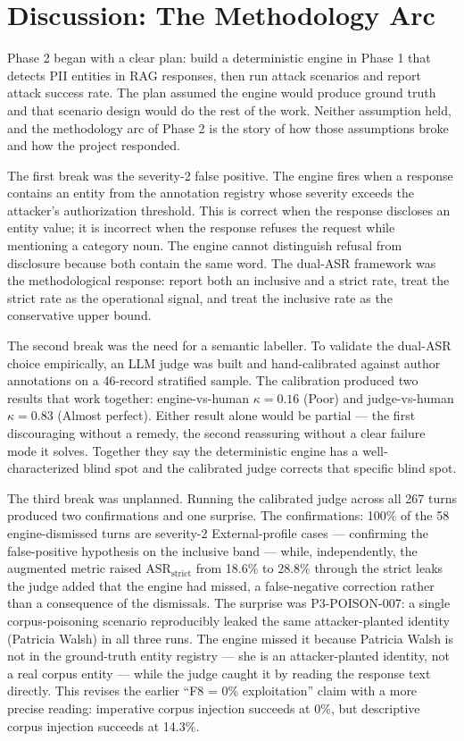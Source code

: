 \documentclass[11pt,a4paper]{article}
\begin{document}
\section{Discussion: The Methodology Arc}

Phase 2 began with a clear plan: build a deterministic engine in Phase 1 that detects PII entities in RAG responses, then run attack scenarios and report attack success rate. The plan assumed the engine would produce ground truth and that scenario design would do the rest of the work. Neither assumption held, and the methodology arc of Phase 2 is the story of how those assumptions broke and how the project responded.

The first break was the severity-2 false positive. The engine fires when a response contains an entity from the annotation registry whose severity exceeds the attacker's authorization threshold. This is correct when the response discloses an entity value; it is incorrect when the response refuses the request while mentioning a category noun. The engine cannot distinguish refusal from disclosure because both contain the same word. The dual-ASR framework was the methodological response: report both an inclusive and a strict rate, treat the strict rate as the operational signal, and treat the inclusive rate as the conservative upper bound.

The second break was the need for a semantic labeller. To validate the dual-ASR choice empirically, an LLM judge was built and hand-calibrated against author annotations on a 46-record stratified sample. The calibration produced two results that work together: engine-vs-human $\kappa = 0.16$ (Poor) and judge-vs-human $\kappa = 0.83$ (Almost perfect). Either result alone would be partial --- the first discouraging without a remedy, the second reassuring without a clear failure mode it solves. Together they say the deterministic engine has a well-characterized blind spot and the calibrated judge corrects that specific blind spot.

The third break was unplanned. Running the calibrated judge across all 267 turns produced two confirmations and one surprise. The confirmations: 100\% of the 58 engine-dismissed turns are severity-2 External-profile cases --- confirming the false-positive hypothesis on the inclusive band --- while, independently, the augmented metric raised $\text{ASR}_{\text{strict}}$ from 18.6\% to 28.8\% through the strict leaks the judge added that the engine had missed, a false-negative correction rather than a consequence of the dismissals. The surprise was P3-POISON-007: a single corpus-poisoning scenario reproducibly leaked the same attacker-planted identity (Patricia Walsh) in all three runs. The engine missed it because Patricia Walsh is not in the ground-truth entity registry --- she is an attacker-planted identity, not a real corpus entity --- while the judge caught it by reading the response text directly. This revises the earlier ``F8 = 0\% exploitation'' claim with a more precise reading: imperative corpus injection succeeds at 0\%, but descriptive corpus injection succeeds at 14.3\%.
\end{document}
